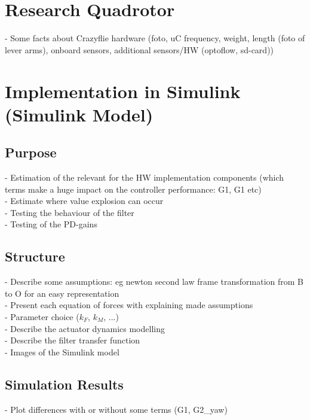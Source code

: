 \documentclass[11pt, a4paper, twoside]{report}
\begin{document}
\section{Research Quadrotor} \label{sec:research_quadrotor}

- Some facts about Crazyflie hardware (foto, uC frequency, weight, length (foto of lever arms), onboard sensors, additional sensors/HW (optoflow, sd-card))

\section{Implementation in Simulink (Simulink Model)} \label{sec:simulink_model}

\subsection{Purpose} \label{subsec:purpose}

- Estimation of the relevant for the HW implementation components (which terms make a huge impact on the controller performance: G1, G1 etc)\\
- Estimate where value explosion can occur\\
- Testing the behaviour of the filter\\
- Testing of the PD-gains

\subsection{Structure} \label{subsec:Structure}
- Describe some assumptions: eg newton second law frame transformation from B to O for an easy representation\\
- Present each equation of forces with explaining made assumptions\\
- Parameter choice ($k_F$, $k_M$, ...)\\
- Describe the actuator dynamics modelling\\
- Describe the filter transfer function\\
- Images of the Simulink model

\subsection{Simulation Results} \label{subsec:simulation_results}

- Plot differences with or without some terms (G1, G2\_yaw) \\
\end{document}
